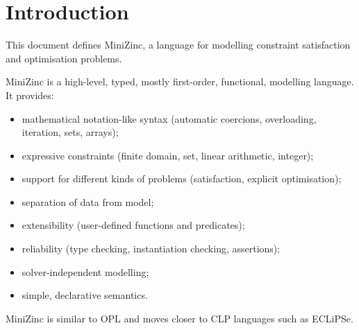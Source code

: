 \documentclass[10pt]{scrartcl}
\begin{document}
\newcommand{\RuleMessage}{
\production{message}
    \oneOrMore{\nt{line}} \\

\production{line}
    \texttt{\%} 
    \regexp{[\carat{}\backsl{}n]*} ~\nl
}

\setcounter{tocdepth}{2}

\pagebreak
\tableofcontents
\pagebreak

\section{Introduction}
This document defines MiniZinc, a language for modelling constraint
satisfaction and optimisation problems.

MiniZinc is a high-level, typed, mostly first-order, functional, modelling
language.  It provides:
\begin{itemize}
\item mathematical notation-like syntax (automatic coercions, overloading,
      iteration, sets, arrays);
\item expressive constraints (finite domain, set, linear arithmetic, integer);
\item support for different kinds of problems (satisfaction, explicit
      optimisation);
\item separation of data from model;
\item extensibility (user-defined functions and predicates);
\item reliability (type checking, instantiation checking, assertions);
\item solver-independent modelling;
\item simple, declarative semantics.
\end{itemize}
MiniZinc is similar to 
OPL and moves closer to CLP languages such as ECLiPSe.
\end{document}
